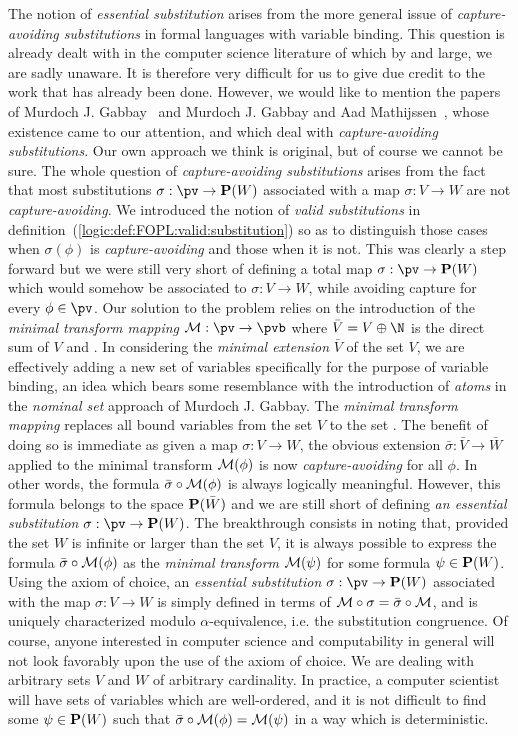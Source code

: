 The notion of {\em essential substitution} arises from the more
general issue of {\em capture-avoiding substitutions} in formal
languages with variable binding. This question is already dealt with
in the computer science literature of which by and large, we are
sadly unaware. It is therefore very difficult for us to give due
credit to the work that has already been done. However, we would
like to mention the papers of Murdoch J. Gabbay~\cite{GabbaySub} and
Murdoch J. Gabbay and Aad Mathijssen~\cite{GabbayCapture}, whose
existence came to our attention, and which deal with {\em
capture-avoiding substitutions}. Our own approach we think is
original, but of course we cannot be sure. The whole question of
{\em capture-avoiding substitutions} arises from the fact that most
substitutions $\sigma:\pv\to{\bf P}(W)$ associated with a map
$\sigma:V\to W$ are not {\em capture-avoiding}. We introduced the
notion of {\em valid substitutions} in
definition~(\ref{logic:def:FOPL:valid:substitution}) so as to
distinguish those cases when $\sigma(\phi)$ is {\em
capture-avoiding} and those when it is not. This was clearly a step
forward but we were still very short of defining a total map
$\sigma:\pv\to{\bf P}(W)$ which would somehow be associated to
$\sigma:V\to W$, while avoiding capture for every $\phi\in\pv$. Our
solution to the problem relies on the introduction of the {\em
minimal transform mapping} ${\cal M}:\pv\to\pvb$ where
$\bar{V}=V\oplus\N$ is the direct sum of $V$ and \N. In considering
the {\em minimal extension} $\bar{V}$ of the set $V$, we are
effectively adding a new set of variables specifically for the
purpose of variable binding, an idea which bears some resemblance
with the introduction of {\em atoms} in the {\em nominal set}
approach of Murdoch J. Gabbay. The {\em minimal transform mapping}
replaces all bound variables from the set $V$ to the set \N. The
benefit of doing so is immediate as given a map $\sigma:V\to W$, the
obvious extension $\bar{\sigma}:\bar{V}\to\bar{W}$ applied to the
minimal transform ${\cal M}(\phi)$ is now {\em capture-avoiding} for
all $\phi$. In other words, the formula $\bar{\sigma}\circ{\cal
M}(\phi)$ is always logically meaningful. However, this formula
belongs to the space ${\bf P}(\bar{W})$ and we are still short of
defining {\em an essential substitution} $\sigma:\pv\to{\bf P}(W)$.
The breakthrough consists in noting that, provided the set $W$ is
infinite or larger than the set $V$, it is always possible to
express the formula $\bar{\sigma}\circ{\cal M}(\phi)$ as the {\em
minimal transform} ${\cal M}(\psi)$ for some formula $\psi\in{\bf
P}(W)$. Using the axiom of choice, an {\em essential substitution}
$\sigma:\pv\to{\bf P}(W)$ associated with the map $\sigma:V\to W$ is
simply defined in terms of ${\cal
M}\circ\sigma=\bar{\sigma}\circ{\cal M}$, and is uniquely
characterized modulo $\alpha$-equivalence, i.e. the substitution
congruence. Of course, anyone interested in computer science and
computability in general will not look favorably upon the use of the
axiom of choice. We are dealing with arbitrary sets $V$ and $W$ of
arbitrary cardinality. In practice, a computer scientist will have
sets of variables which are well-ordered, and it is not difficult to
find some $\psi\in{\bf P}(W)$ such that $\bar{\sigma}\circ{\cal
M}(\phi)={\cal M}(\psi)$ in a way which is deterministic.
